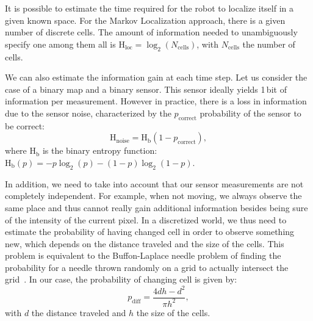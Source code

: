 \documentclass[letterpaper, 10pt, conference]{ieeeconf}
\newcommand{\ent}[1]{\mathrm{H}_\mathrm{#1}} %
\begin{document}
It is possible to estimate the time required for the robot to localize itself in a given known space.
For the Markov Localization approach, there is a given number of discrete cells.
The amount of information needed to unambiguously specify one among them all is $\ent{loc} = \log_2(N_\mathrm{cells})$, with $N_\mathrm{cells}$ the number of cells.

We can also estimate the information gain at each time step.
Let us consider the case of a binary map and a binary sensor.
This sensor ideally yields 1\,bit of information per measurement.
However in practice, there is a loss in information due to the sensor noise, characterized by the $p_\mathrm{correct}$ probability of the sensor to be correct:
\begin{displaymath}
	\ent{noise} = \ent{b}(1 - p_\mathrm{correct}),
\end{displaymath}
where $\ent{b}$ is the binary entropy function: $\ent{b}(p) = -p\log_2(p) - (1-p)\log_2(1-p)$.

In addition, we need to take into account that our sensor measurements are not completely independent.
For example, when not moving, we always observe the same place and thus cannot really gain additional information besides being sure of the intensity of the current pixel.
In a discretized world, we thus need to estimate the probability of having changed cell in order to observe something new, which depends on the distance traveled and the size of the cells.
This problem is equivalent to the Buffon-Laplace needle problem of finding the probability for a needle thrown randomly on a grid to actually intersect the grid~\cite{laplace1820prob}.
In our case, the probability of changing cell is given by:
\begin{displaymath}
	p_\mathrm{diff} = \frac{4d h - d^2}{\pi h^2},
\end{displaymath}
with $d$ the distance traveled and $h$ the size of the cells.
\end{document}

